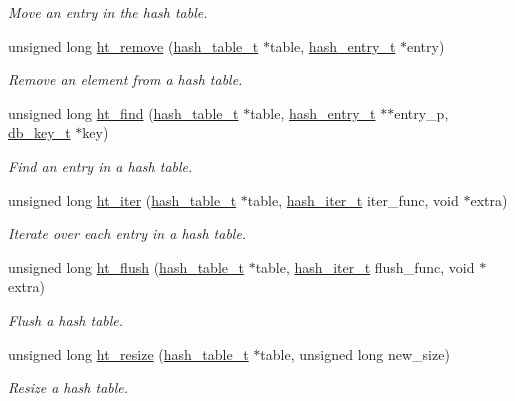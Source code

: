 \begin{CompactItemize}
\begin{CompactList}\small\item\em Move an entry in the hash table. \item\end{CompactList}\item 
unsigned long \hyperlink{group__dbprim__hash_ga12}{ht\_\-remove} (\hyperlink{struct__hash__table__s}{hash\_\-table\_\-t} $\ast$table, \hyperlink{struct__hash__entry__s}{hash\_\-entry\_\-t} $\ast$entry)
\begin{CompactList}\small\item\em Remove an element from a hash table. \item\end{CompactList}\item 
unsigned long \hyperlink{group__dbprim__hash_ga13}{ht\_\-find} (\hyperlink{struct__hash__table__s}{hash\_\-table\_\-t} $\ast$table, \hyperlink{struct__hash__entry__s}{hash\_\-entry\_\-t} $\ast$$\ast$entry\_\-p, \hyperlink{struct__db__key__s}{db\_\-key\_\-t} $\ast$key)
\begin{CompactList}\small\item\em Find an entry in a hash table. \item\end{CompactList}\item 
unsigned long \hyperlink{group__dbprim__hash_ga14}{ht\_\-iter} (\hyperlink{struct__hash__table__s}{hash\_\-table\_\-t} $\ast$table, \hyperlink{group__dbprim__hash_ga3}{hash\_\-iter\_\-t} iter\_\-func, void $\ast$extra)
\begin{CompactList}\small\item\em Iterate over each entry in a hash table. \item\end{CompactList}\item 
unsigned long \hyperlink{group__dbprim__hash_ga15}{ht\_\-flush} (\hyperlink{struct__hash__table__s}{hash\_\-table\_\-t} $\ast$table, \hyperlink{group__dbprim__hash_ga3}{hash\_\-iter\_\-t} flush\_\-func, void $\ast$extra)
\begin{CompactList}\small\item\em Flush a hash table. \item\end{CompactList}\item 
unsigned long \hyperlink{group__dbprim__hash_ga16}{ht\_\-resize} (\hyperlink{struct__hash__table__s}{hash\_\-table\_\-t} $\ast$table, unsigned long new\_\-size)
\begin{CompactList}\small\item\em Resize a hash table. \item\end{CompactList}\item 
$$
\end{CompactItemize}
